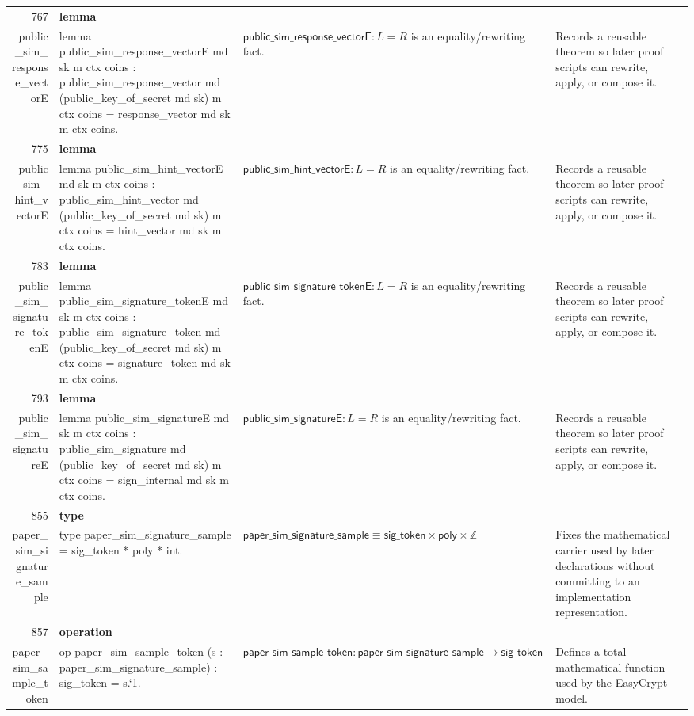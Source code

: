 \documentclass[10pt]{article}
\newcommand{\ec}[1]{\begingroup\ttfamily\scriptsize #1\endgroup}
\begin{document}
\begin{longtable}{r L{0.17\textwidth} L{0.26\textwidth} L{0.27\textwidth} L{0.20\textwidth}}
767 & \textbf{lemma}\\\ec{public\_sim\_response\_vectorE} & \ec{lemma public\_sim\_response\_vectorE md sk m ctx coins : public\_sim\_response\_vector md (public\_key\_of\_secret md sk) m ctx coins = response\_vector md sk m ctx coins.} & \(\mathsf{public\_sim\_response\_vectorE} : L = R\) is an equality/rewriting fact. & Records a reusable theorem so later proof scripts can rewrite, apply, or compose it. \\
775 & \textbf{lemma}\\\ec{public\_sim\_hint\_vectorE} & \ec{lemma public\_sim\_hint\_vectorE md sk m ctx coins : public\_sim\_hint\_vector md (public\_key\_of\_secret md sk) m ctx coins = hint\_vector md sk m ctx coins.} & \(\mathsf{public\_sim\_hint\_vectorE} : L = R\) is an equality/rewriting fact. & Records a reusable theorem so later proof scripts can rewrite, apply, or compose it. \\
783 & \textbf{lemma}\\\ec{public\_sim\_signature\_tokenE} & \ec{lemma public\_sim\_signature\_tokenE md sk m ctx coins : public\_sim\_signature\_token md (public\_key\_of\_secret md sk) m ctx coins = signature\_token md sk m ctx coins.} & \(\mathsf{public\_sim\_signature\_tokenE} : L = R\) is an equality/rewriting fact. & Records a reusable theorem so later proof scripts can rewrite, apply, or compose it. \\
793 & \textbf{lemma}\\\ec{public\_sim\_signatureE} & \ec{lemma public\_sim\_signatureE md sk m ctx coins : public\_sim\_signature md (public\_key\_of\_secret md sk) m ctx coins = sign\_internal md sk m ctx coins.} & \(\mathsf{public\_sim\_signatureE} : L = R\) is an equality/rewriting fact. & Records a reusable theorem so later proof scripts can rewrite, apply, or compose it. \\
855 & \textbf{type}\\\ec{paper\_sim\_signature\_sample} & \ec{type paper\_sim\_signature\_sample = sig\_token * poly * int.} & \(\mathsf{paper\_sim\_signature\_sample} \equiv \mathsf{sig\_token} \times \mathsf{poly} \times \mathbb{Z}\) & Fixes the mathematical carrier used by later declarations without committing to an implementation representation. \\
857 & \textbf{operation}\\\ec{paper\_sim\_sample\_token} & \ec{op paper\_sim\_sample\_token (s : paper\_sim\_signature\_sample) : sig\_token = s.`1.} & \(\mathsf{paper\_sim\_sample\_token} : \mathsf{paper\_sim\_signature\_sample} \to \mathsf{sig\_token}\) & Defines a total mathematical function used by the EasyCrypt model. \\

\end{longtable}
\end{document}
